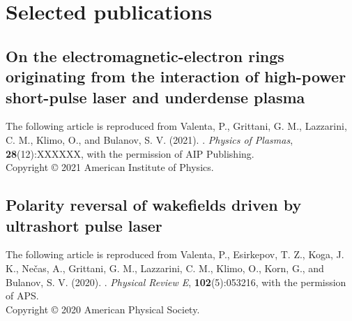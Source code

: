 \documentclass[10pt, a4paper, twoside, openright]{report}
\newcommand{\link}[3][blue]{\href{#2}{\color{#1}{#3}}}%
\begin{document}
\chapter{Selected publications\label{chap:selected_publications}}
%

\section{On the electromagnetic-electron rings originating from the interaction of high-power short-pulse laser and underdense plasma \label{sec:paper_1}}

The following article is reproduced from Valenta, P., Grittani, G. M., Lazzarini, C. M., Klimo, O., and Bulanov, S. V. (2021). \link{http://dx.doi.org/}{On the electromagnetic-electron rings originating from the interaction of high-power short-pulse laser and underdense plasma}. \textit{Physics of Plasmas}, \textbf{28}(12):XXXXXX, with the permission of AIP Publishing. \\

\noindent Copyright {\copyright} {2021} {American Institute of Physics}.

\newpage
\mbox{}
\thispagestyle{empty}

%


\newpage
\section{Polarity reversal of wakefields driven by ultrashort pulse laser \label{sec:paper_2}}

The following article is reproduced from Valenta, P., Esirkepov, T. Z., Koga, J. K., Nečas, A., Grittani, G. M., Lazzarini, C. M., Klimo, O., Korn, G., and Bulanov, S. V. (2020). \link{http://dx.doi.org/10.1103/PhysRevE.102.053216}{Polarity reversal of wakefields driven by ultrashort pulse laser}. \textit{Physical Review E}, \textbf{102}(5):053216, with the permission of APS. \\

\noindent Copyright {\copyright} {2020} {American Physical Society}.

\newpage
\mbox{}
\thispagestyle{empty}

\newpage


\mbox{}
\thispagestyle{empty}
\newpage
\end{document}
